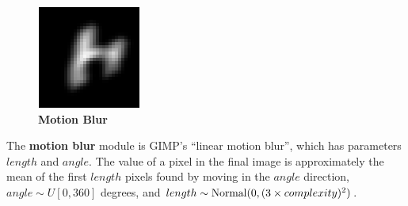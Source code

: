 \documentclass{article} %
\begin{document}
\begin{minipage}[h]{\linewidth}
\begin{figure}
\begin{center}
\vspace*{-5mm}
\includegraphics[scale=.4]{images/Motionblur_only.png}\\
{\bf Motion Blur}
\end{center}
\end{figure}
The {\bf motion blur} module is GIMP's ``linear motion blur'', which
has parameters $length$ and $angle$. The value of
a pixel in the final image is approximately the  mean of the first $length$ pixels
found by moving in the $angle$ direction,
$angle \sim U[0,360]$ degrees, and $length \sim {\rm Normal}(0,(3 \times complexity)^2)$.
\vspace{5mm}
\end{minipage}

\vspace*{1mm}
\end{document}
